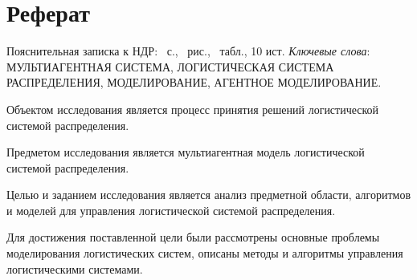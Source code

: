 \Russian
\section*{Реферат}
Пояснительная записка к НДР: \pageref{LastPage}~с., \totalfigures~рис., \totaltables~табл., 10 ист. \bigbreak
\textit{Ключевые слова}: \MakeUppercase{мультиагентная система, логистическая система распределения, моделирование, агентное моделирование}. \bigbreak

Объектом исследования является процесс принятия решений логистической системой распределения.

Предметом исследования является мультиагентная модель  логистической системой распределения. 

Целью и заданием исследования является анализ предметной области, алгоритмов и моделей для управления логистической системой распределения.

Для достижения поставленной цели были рассмотрены основные проблемы моделирования логистических систем, описаны методы и алгоритмы управления логистическими системами.

\Ukrainian
